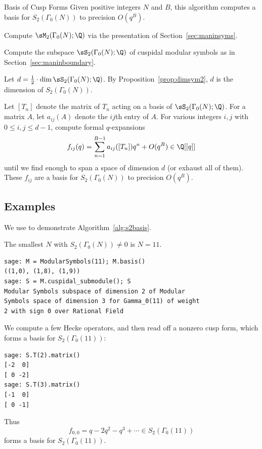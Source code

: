 \begin{algorithm}{Basis of Cusp Forms}\label{alg:s2basis}
Given positive integers $N$ and $B$, this algorithm computes
a basis for $S_2(\Gamma_0(N))$ to precision $O(q^B)$.
\begin{steps}
\item Compute $\sM_2(\Gamma_0(N);\Q)$
via the presentation of Section~\ref{sec:maninsyms}.
\item Compute the subspace $\sS_2(\Gamma_0(N);\Q)$ 
of cuspidal modular symbols as in Section~\ref{sec:maninboundary}.
\item Let $d=\frac{1}{2}\cdot \dim\sS_2(\Gamma_0(N);\Q)$.  
By Proposition~\ref{prop:dimsym2}, 
$d$ is the dimension of $S_2(\Gamma_0(N))$.
\item Let $[T_n]$ denote the matrix of $T_n$ acting
 on a basis of $\sS_2(\Gamma_0(N);\Q)$.  For a matrix $A$, let 
$a_{ij}(A)$ denote the $ij$th entry of $A$.  
For various integers $i,j$ with $0\leq i,j \leq d-1$,
compute formal $q$-expansions
$$
  f_{ij}(q) = \sum_{n=1}^{B-1} a_{ij}([T_n])q^n + O(q^{B}) \in \Q[[q]]
$$
until we find enough to span a space of dimension $d$ (or exhaust
all of them).  These $f_{ij}$ are
a basis for $S_2(\Gamma_0(N))$ to precision $O(q^{B})$.
\end{steps}
\end{algorithm}

\subsection{Examples}
We use \sage{} to demonstrate
Algorithm~\ref{alg:s2basis}.

\begin{example}
The smallest $N$ with $S_2(\Gamma_0(N))\neq 0$ is $N=11$.
\begin{verbatim}
sage: M = ModularSymbols(11); M.basis()
((1,0), (1,8), (1,9))
sage: S = M.cuspidal_submodule(); S
Modular Symbols subspace of dimension 2 of Modular 
Symbols space of dimension 3 for Gamma_0(11) of weight 
2 with sign 0 over Rational Field
\end{verbatim}%

We compute a few Hecke operators, and then read off a 
nonzero cusp form, which forms a basis for $S_2(\Gamma_0(11))$:
\begin{verbatim}
sage: S.T(2).matrix()
[-2  0]
[ 0 -2]
sage: S.T(3).matrix()
[-1  0]
[ 0 -1]
\end{verbatim}
Thus 
$$
 f_{0,0} = q - 2q^2 - q^3 + \cdots \in S_2(\Gamma_0(11))
$$
forms a basis for $S_2(\Gamma_0(11))$.
\end{example}


